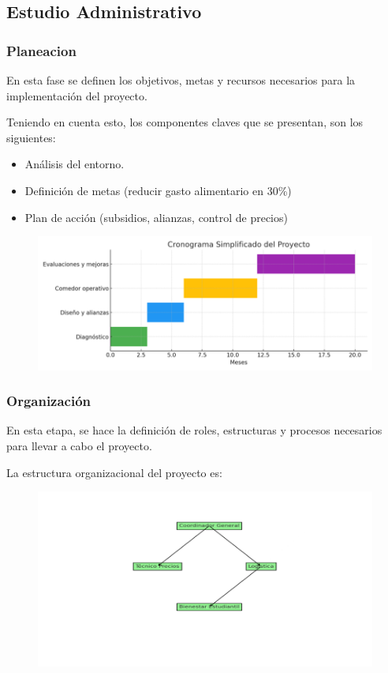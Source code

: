 \documentclass[letterpaper, 11pt]{report}
\begin{document}
\subsection{Estudio Administrativo}

\subsubsection{Planeacion}
En esta fase se definen los objetivos, metas y recursos  necesarios para la implementación del proyecto. 

Teniendo en cuenta esto, los componentes claves que se presentan, son los siguientes: 

\begin{itemize}
      \item Análisis del entorno. 
      \item Definición de metas (reducir gasto alimentario en 30\%) 
      \item Plan de acción (subsidios, alianzas, control de precios) 
\end{itemize}

\begin{figure}[ht]
      \centering
      \includegraphics[width=\textwidth]{Images/cronograma_simplificado.png}
\end{figure}

\subsubsection{Organización}

En esta etapa, se hace la definición de roles, estructuras y procesos necesarios para llevar a cabo el proyecto. 

La estructura organizacional del proyecto es: 

\begin{figure}[ht]
      \centering
      \includegraphics[width=\textwidth]{Images/estructura_proyecto.png}
\end{figure}
\end{document}
